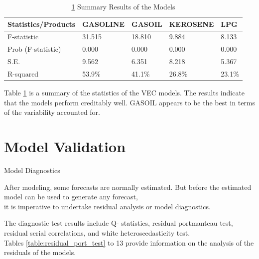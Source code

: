 \documentclass{beamer}
\begin{document}
	\begin{frame}
		\begin{table}
			\caption{ \ref{table:model_summary} Summary Results of the Models}
			\label{table:model_summary}
			\begin{tabular}{lllll}
				\toprule
				Statistics/Products & GASOLINE & GASOIL & KEROSENE & LPG \\
				\midrule
				
				F-statistic         & 31.515 & 18.810 & 9.884 & 8.133 \\ [10pt]
				Prob (F-statistic)  & 0.000 & 0.000 & 0.000 & 0.000   \\ [10pt]
				S.E.                & 9.562 & 6.351 & 8.218 & 5.367   \\ [10pt]
				R-squared           & 53.9\% & 41.1\% & 26.8\% & 23.1\% \\ [10pt]
				\bottomrule
			\end{tabular}
		\end{table}
	
		\begin{exampleblock}{}
			Table \ref{table:model_summary} is a summary of the statistics of the VEC models. The results indicate that the models perform creditably well. GASOIL appears to be the best in terms of the variability accounted for.
		\end{exampleblock}
	\end{frame}

	
	\section{Model Validation}
	\begin{frame}{Model Diagnostics}
		\begin{block}{}
			After modeling, some forecasts are normally estimated. But before the estimated model can be used to generate any forecast,\\
			it is imperative to undertake residual analysis or model diagnostics.
		\end{block}
		
		\begin{block}{}
			The diagnostic test results include Q- statistics, residual portmanteau test, residual serial correlations, and white heteroscedasticity test. \\
			Tables \ref{table:residual_port_test} to 13 provide information on the analysis of the residuals of the models.
		\end{block}
	\end{frame}
	
\end{document}

